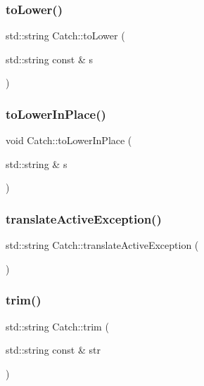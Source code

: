 \mbox{\label{namespaceCatch_ac036a17412d318598ffda8e1fe7a1177}} 
\subsubsection{\texorpdfstring{to\+Lower()}{toLower()}}
{\footnotesize\ttfamily std\+::string Catch\+::to\+Lower (\begin{DoxyParamCaption}\item[{std\+::string const \&}]{s }\end{DoxyParamCaption})}

\mbox{\label{namespaceCatch_a0760dbe87d090a55a35414db57d272c4}} 
\subsubsection{\texorpdfstring{to\+Lower\+In\+Place()}{toLowerInPlace()}}
{\footnotesize\ttfamily void Catch\+::to\+Lower\+In\+Place (\begin{DoxyParamCaption}\item[{std\+::string \&}]{s }\end{DoxyParamCaption})}

\mbox{\label{namespaceCatch_adafff91485eeeeb9e9333f317cc0e3b1}} 
\subsubsection{\texorpdfstring{translate\+Active\+Exception()}{translateActiveException()}}
{\footnotesize\ttfamily std\+::string Catch\+::translate\+Active\+Exception (\begin{DoxyParamCaption}{ }\end{DoxyParamCaption})}

\mbox{\label{namespaceCatch_a084108b47f37d8bfd5db51c50c7451b3}} 
\subsubsection{\texorpdfstring{trim()}{trim()}}
{\footnotesize\ttfamily std\+::string Catch\+::trim (\begin{DoxyParamCaption}\item[{std\+::string const \&}]{str }\end{DoxyParamCaption})}


